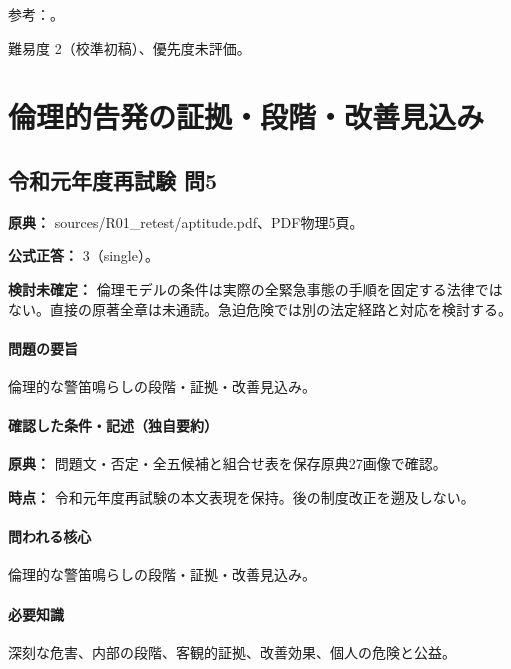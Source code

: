 \par 参考：\cite{cabinet_npo_overview,cabinet_npo_officers}。

\par 難易度 2（校準初稿）、優先度未評価。

\section{倫理的告発の証拠・段階・改善見込み}

\subsection{令和元年度再試験 問5}
\label{q:r01-ret-apt-05}

\noindent\textbf{原典：} sources/R01\_retest/aptitude.pdf、PDF物理5頁。

\textbf{公式正答：} 3（single）。

\par\textbf{検討未確定：} 倫理モデルの条件は実際の全緊急事態の手順を固定する法律ではない。直接の原著全章は未通読。急迫危険では別の法定経路と対応を検討する。

\paragraph{問題の要旨} 倫理的な警笛鳴らしの段階・証拠・改善見込み。

\paragraph{確認した条件・記述（独自要約）}\mbox{}\par

\noindent\textbf{原典：} 問題文・否定・全五候補と組合せ表を保存原典27画像で確認。\par

\noindent\textbf{時点：} 令和元年度再試験の本文表現を保持。後の制度改正を遡及しない。\par

\paragraph{問われる核心} 倫理的な警笛鳴らしの段階・証拠・改善見込み。

\paragraph{必要知識} 深刻な危害、内部の段階、客観的証拠、改善効果、個人の危険と公益。

